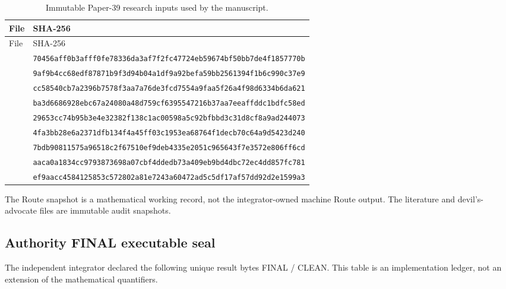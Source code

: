 \begin{longtable}{@{}L{5.0cm}L{9.3cm}@{}}
\caption{Immutable Paper-39 research inputs used by the manuscript.}
\label{tab:hashes}\\
\toprule
File & SHA-256 \\
\midrule
\endfirsthead
\toprule
File & SHA-256 \\
\midrule
\endhead
{} & \nolinkurl{70456aff0b3afff0fe78336da3af7f2fc47724eb59674bf50bb7de4f1857770b} \\
 & \nolinkurl{9af9b4cc68edf87871b9f3d94b04a1df9a92befa59bb2561394f1b6c990c37e9} \\
 & \nolinkurl{cc58540cb7a2396b7578f3aa7a76de3fcd7554a9faa5f26a4f98d6334b6da621} \\
 & \nolinkurl{ba3d6686928ebc67a24080a48d759cf6395547216b37aa7eeaffddc1bdfc58ed} \\
 & \nolinkurl{29653cc74b95b3e4e32382f138c1ac00598a5c92bfbbd3c31d8cf8a9ad244073} \\
 & \nolinkurl{4fa3bb28e6a2371dfb134f4a45ff03c1953ea68764f1decb70c64a9d5423d240} \\
 & \nolinkurl{7bdb90811575a96518c2f67510ef9deb4335e2051c965643f7e3572e806ff6cd} \\
 & \nolinkurl{aaca0a1834cc9793873698a07cbf4ddedb73a409eb9bd4dbc72ec4dd857fc781} \\
 & \nolinkurl{ef9aacc4584125853c572802a81e7243a60472ad5c5df17af57dd92d2e1599a3} \\
\bottomrule
\end{longtable}

The Route snapshot is a mathematical working record, not the integrator-owned
machine Route output.  The literature and devil's-advocate files are immutable
audit snapshots.

\subsection{Authority FINAL executable seal}

The independent integrator declared the following unique result bytes FINAL /
CLEAN.  This table is an implementation ledger, not an extension of the
mathematical quantifiers.

